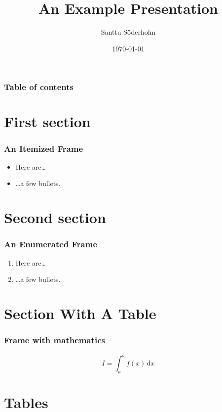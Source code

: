 \documentclass[tikz]{beamer}
\title{An Example Presentation}
\date{\today}
\author[Söderholm]{Santtu Söderholm}
\begin{document}
\begin{frame}
\titlepage
\end{frame}

\begin{frame}
\frametitle{Table of contents}
\tableofcontents
\end{frame}

\section{First section}

\begin{frame}
\frametitle{An Itemized Frame}
\begin{itemize}
\item Here are\ldots
\item \ldots a few bullets.
\end{itemize}
\end{frame}

\section{Second section}

\begin{frame}
\frametitle{An Enumerated Frame}
\begin{enumerate}
\item Here are\ldots
\item \ldots a few bullets.
\end{enumerate}
\end{frame}

\section{Section With A Table}

\begin{frame}
\frametitle{Frame with mathematics}
\begin{equation}
I = \int_a^b f(x) \,\mathrm d x
\end{equation}
\end{frame}

\section{Tables}
\end{document}
